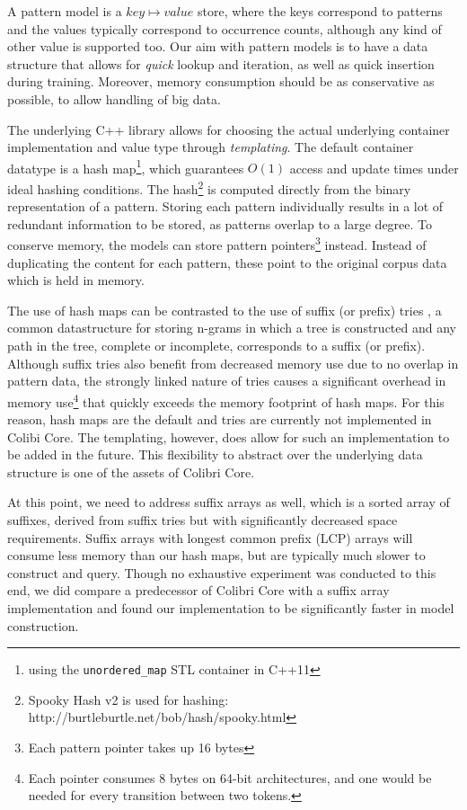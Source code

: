 A pattern model is a $key \mapsto value$ store, where the keys correspond to
patterns and the values typically correspond to occurrence counts, although any
kind of other value is supported too. Our aim with pattern models is to have a
data structure that allows for \emph{quick} lookup and iteration, as well as
quick insertion during training. Moreover, memory consumption should be as
conservative as possible, to allow handling of big data.

The underlying C++ library allows for choosing the actual underlying container
implementation and value type through \emph{templating}. The default container
datatype is a hash map\footnote{using the \texttt{unordered\_map} STL container
in C++11}, which guarantees $O(1)$ access and update times under ideal hashing
conditions. The hash\footnote{Spooky Hash v2 is used for hashing:
http://burtleburtle.net/bob/hash/spooky.html} is computed directly from the
binary representation of a pattern. Storing each pattern individually results
in a lot of redundant information to be stored, as patterns overlap to a large
degree. To conserve memory, the models can store pattern pointers\footnote{Each
pattern pointer takes up 16 bytes} instead. Instead of duplicating the content
for each pattern, these point to the original corpus data which is held in
memory.

The use of hash maps can be contrasted to the use of suffix (or prefix) tries
\cite{Weiner73}, a common datastructure for storing n-grams in which a tree is
constructed and any path in the tree, complete or incomplete, corresponds to a
suffix (or prefix).  Although suffix tries also benefit from decreased memory
use due to no overlap in pattern data, the strongly linked nature of tries
causes a significant overhead in memory use\footnote{Each pointer consumes 8
    bytes on 64-bit architectures, and one would be needed for every transition
between two tokens.} that quickly exceeds the memory footprint of hash maps.
For this reason, hash maps are the default and tries are currently not
implemented in Colibi Core. The templating, however, does allow for such an
implementation to be added in the future. This flexibility to abstract over the
underlying data structure is one of the assets of Colibri Core.

At this point, we need to address suffix arrays \cite{Manber90} as well, which
is a sorted array of suffixes, derived from suffix tries but with significantly
decreased space requirements. Suffix arrays with longest common prefix (LCP)
arrays will consume less memory than our hash maps, but are typically much
slower to construct and query. Though no exhaustive experiment was conducted to
this end, we did compare a predecessor of Colibri Core with a suffix array
implementation \cite{Stehouwer10} and found our implementation to be
significantly faster in model construction.

